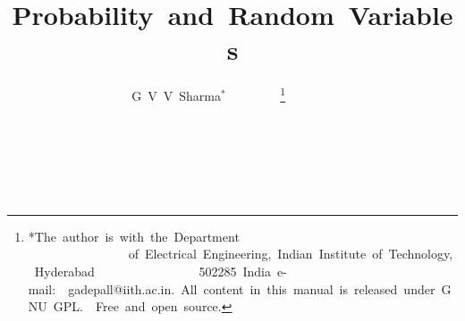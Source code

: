 \documentclass[journal,12pt,twocolumn]{IEEEtran}
\begin{document}
 \let\StandardTheFigure\thefigure 
 \let\vec\mathbf 
 \renewcommand{\thefigure}{\theproblem} 
  
  
  
 \def\putbox#1#2#3{\makebox[0in][l]{\makebox[#1][l]{}\raisebox{\baselineskip}[0in][0in]{\raisebox{#2}[0in][0in]{#3}}}} 
      \def\rightbox#1{\makebox[0in][r]{#1}} 
      \def\centbox#1{\makebox[0in]{#1}} 
      \def\topbox#1{\raisebox{-\baselineskip}[0in][0in]{#1}} 
      \def\midbox#1{\raisebox{-0.5\baselineskip}[0in][0in]{#1}} 
  
 \vspace{3cm} 
  
 \title{ 
 Probability and Random Variables 
 } 
 \author{ G V V Sharma$^{*}$%
         \thanks{*The author is with the Department 
                 of Electrical Engineering, Indian Institute of Technology, Hyderabad 
                 502285 India e-mail:  gadepall@iith.ac.in. All content in this manual is released under GNU GPL.  Free and open source.} 
          
 }         
  
  
  
  
\end{document}
